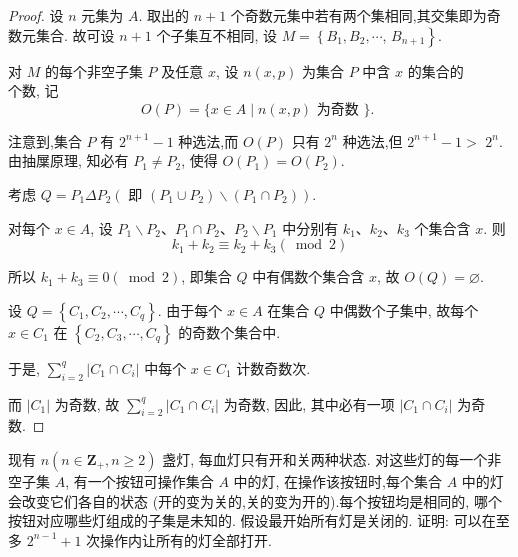 \begin{proof}
	设 $n$ 元集为 $A$. 取出的 $n+1$ 个奇数元集中若有两个集相同,其交集即为奇数元集合. 故可设 $n+1$ 个子集互不相同, 设 $M=\left\{B_{1}, B_{2}, \cdots\right.$, $\left.B_{n+1}\right\}$.

	对 $M$ 的每个非空子集 $P$ 及任意 $x$, 设 $n(x, p)$ 为集合 $P$ 中含 $x$ 的集合的\\
	个数, 记
	$$
		O(P)=\{x \in A \mid n(x, p) \text { 为奇数 }\} \text {. }
	$$

	注意到,集合 $P$ 有 $2^{n+1}-1$ 种选法,而 $O(P)$ 只有 $2^{n}$ 种选法,但 $2^{n+1}-1>$ $2^{n}$. 由抽屟原理, 知必有 $P_{1} \neq P_{2}$, 使得 $O\left(P_{1}\right)=O\left(P_{2}\right)$.

	考虑 $Q=P_{1} \Delta P_{2}\left(\right.$ 即 $\left.\left(P_{1} \cup P_{2}\right) \backslash\left(P_{1} \cap P_{2}\right)\right)$.

	对每个 $x \in A$, 设 $P_{1} \backslash P_{2} 、 P_{1} \cap P_{2} 、 P_{2} \backslash P_{1}$ 中分别有 $k_{1} 、 k_{2} 、 k_{3}$ 个集合含 $x$. 则
	$$
		k_{1}+k_{2} \equiv k_{2}+k_{3}(\bmod 2)
	$$

	所以 $k_{1}+k_{3} \equiv 0(\bmod 2)$, 即集合 $Q$ 中有偶数个集合含 $x$, 故 $O(Q)=\varnothing$.

	设 $Q=\left\{C_{1}, C_{2}, \cdots, C_{q}\right\}$. 由于每个 $x \in A$ 在集合 $Q$ 中偶数个子集中, 故每个 $x \in C_{1}$ 在 $\left\{C_{2}, C_{3}, \cdots, C_{q}\right\}$ 的奇数个集合中.

	于是, $\sum_{i=2}^{q}\left|C_{1} \cap C_{i}\right|$ 中每个 $x \in C_{1}$ 计数奇数次.

	而 $\left|C_{1}\right|$ 为奇数, 故 $\sum_{i=2}^{q}\left|C_{1} \cap C_{i}\right|$ 为奇数, 因此, 其中必有一项 $\left|C_{1} \cap C_{i}\right|$ 为奇数.
\end{proof}

\begin{example}
	现有 $n\left(n \in \mathbf{Z}_{+}, n \geqslant 2\right)$ 盏灯, 每血灯只有开和关两种状态. 对这些灯的每一个非空子集 $A$, 有一个按钮可操作集合 $A$ 中的灯, 在操作该按钮时,每个集合 $A$ 中的灯会改变它们各自的状态 (开的变为关的,关的变为开的).每个按钮均是相同的, 哪个按钮对应哪些灯组成的子集是未知的. 假设最开始所有灯是关闭的. 证明: 可以在至多 $2^{n-1}+1$ 次操作内让所有的灯全部打开.
\end{example}

